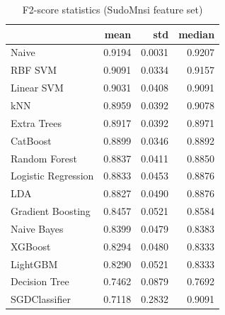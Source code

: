 \begin{table}
\caption{F2-score statistics (SudoMnsi feature set)}
\label{tab:f2_SudoMnsi_stats}
\begin{tabular}{lrrr}
\toprule
 & mean & std & median \\
\midrule
Naive & 0.9194 & 0.0031 & 0.9207 \\
RBF SVM & 0.9091 & 0.0334 & 0.9157 \\
Linear SVM & 0.9031 & 0.0408 & 0.9091 \\
kNN & 0.8959 & 0.0392 & 0.9078 \\
Extra Trees & 0.8917 & 0.0392 & 0.8971 \\
CatBoost & 0.8899 & 0.0346 & 0.8892 \\
Random Forest & 0.8837 & 0.0411 & 0.8850 \\
Logistic Regression & 0.8833 & 0.0453 & 0.8876 \\
LDA & 0.8827 & 0.0490 & 0.8876 \\
Gradient Boosting & 0.8457 & 0.0521 & 0.8584 \\
Naive Bayes & 0.8399 & 0.0479 & 0.8383 \\
XGBoost & 0.8294 & 0.0480 & 0.8333 \\
LightGBM & 0.8290 & 0.0521 & 0.8333 \\
Decision Tree & 0.7462 & 0.0879 & 0.7692 \\
SGDClassifier & 0.7118 & 0.2832 & 0.9091 \\
\bottomrule
\end{tabular}
\end{table}
